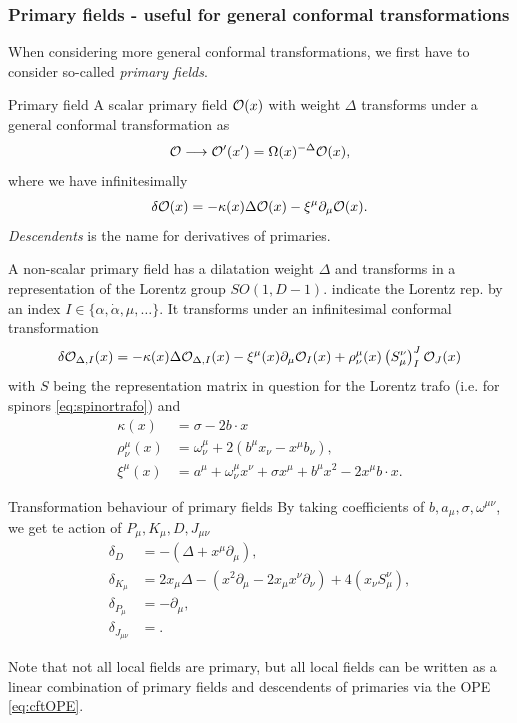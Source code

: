 \subsubsection{Primary fields - useful for general conformal transformations}
When considering more general conformal transformations, we first have to consider so-called \emph{primary fields}.
\begin{mybox}{Primary field}
	A scalar primary field $\mathcal{O}(x)$ with weight $\Delta$ transforms under a general conformal transformation as
	\begin{equation}
	\label{eq:cftPrimaryfields}
	\mathcal{O} \longrightarrow \mathcal{O}^\prime (x^\prime) = \Omega(x)^{-\Delta} \mathcal{O}(x),
	\end{equation}
	where we have infinitesimally
	\begin{equation}
		\label{eq:cftPrimaryfieldsInfinitesimal}
		\delta \mathcal{O}(x) = - \kappa(x) \Delta \mathcal{O}(x) - \xi^\mu \partial_\mu \mathcal{O}(x).
	\end{equation}
	\emph{Descendents} is the name for derivatives of primaries.
\end{mybox}
A non-scalar primary field has a dilatation weight $\Delta$ and transforms in a representation of the Lorentz group $SO(1,D-1)$. indicate the Lorentz rep. by an index $I \in \{\alpha,\dot{\alpha},\mu,\dots \}$. It transforms under an infinitesimal conformal transformation
\begin{equation}
	\delta\mathcal{O}_{\Delta, I} (x) =- \kappa(x) \Delta \mathcal{O}_{\Delta,I} (x) -\xi^\mu (x) \partial_\mu \mathcal{O}_I(x) +\rho^\mu_\nu(x) \left(S^\nu_\mu\right)^J_I \mathcal{O}_J(x) 
\end{equation}
with $S$ being the representation matrix in question for the Lorentz trafo (i.e. for spinors \ref{eq:spinortrafo}) and
\begin{align*}
\kappa(x) &= \sigma - 2 b \cdot x \\ 
\rho^\mu_\nu(x) &= \omega^\mu_\nu + 2 \left(b^\mu x_\nu - x^\mu b_\nu \right),\\
\xi^\mu(x) &= a^\mu + \omega^\mu_\nu x^\nu + \sigma x^\mu + b^\mu x^2 -2 x^\mu b\cdot x.
\end{align*}
\begin{mybox}{Transformation behaviour of primary fields}
By taking coefficients of $b, a_\mu,  \sigma, \omega^{\mu \nu}$, we get te action of $P_\mu, K_\mu, D,J_{\mu \nu}$
\begin{align}
	\label{eq:cftPrimaryTrafo}
\delta_D &= - (\Delta +x^\mu \partial_\mu),\\
\delta_{K_\mu} &= 2 x_\mu \Delta - (x^2 \partial_\mu - 2 x_\mu x^\nu \partial_\nu) + 4(x_\nu S^\nu_\mu)\nonumber,\\
\delta_{P_\mu} &= -\partial_\mu \nonumber, \\
\delta_{J_{\mu \nu}} &= \nonumber.
\end{align}
\end{mybox}
Note that not all local fields are primary, but all local fields can be written as a linear combination of primary fields and descendents of primaries via the OPE \ref{eq:cftOPE}.
